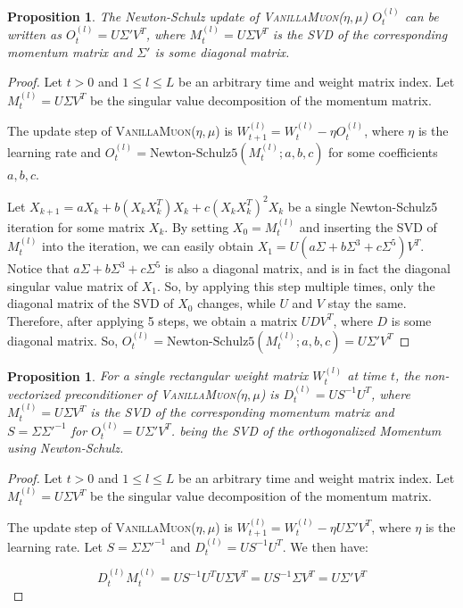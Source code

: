 \documentclass{article}
\theoremstyle{plain}
\newtheorem{proposition}[theorem]{Proposition}
\theoremstyle{definition}
\theoremstyle{remark}
\begin{document}
\begin{proposition}
The Newton-Schulz update of \textsc{VanillaMuon}($\eta, \mu$) $O_{t}^{(l)}$ can be written as $O_{t}^{(l)} = U \Sigma' V^T$, where $M_{t}^{(l)} = U \Sigma V^T$ is the SVD of the corresponding momentum matrix and $\Sigma'$ is some diagonal matrix.
\end{proposition}

\begin{proof}
Let $t > 0$ and $1 \le l \le L$ be an arbitrary time and weight matrix index. Let $M_{t}^{(l)} = U \Sigma V^T$ be the singular value decomposition of the momentum matrix.

The update step of \textsc{VanillaMuon($\eta, \mu$)} is $W_{t+1}^{(l)} = W_t^{(l)} - \eta O_{t}^{(l)}$, where $\eta$ is the learning rate and $O_{t}^{(l)} = \text{Newton-Schulz5}(M_t^{(l)}; a,b,c)$ for some coefficients $a, b, c$. 

Let $X_{k+1} = aX_k + b(X_kX_k^T)X_k + c (X_kX_k^T)^2X_k$ be a single Newton-Schulz5 iteration for some matrix $X_k$. By setting $X_0 = M_{t}^{(l)}$ and inserting the SVD of $M_{t}^{(l)}$ into the iteration, we can easily obtain $X_1 = U(a\Sigma + b\Sigma^3 + c\Sigma^5)V^T$. Notice that $a\Sigma + b\Sigma^3 + c\Sigma^5$ is also a diagonal matrix, and is in fact the diagonal singular value matrix of $X_1$. So, by applying this step multiple times, only the diagonal matrix of the SVD of $X_0$ changes, while $U$ and $V$ stay the same. Therefore, after applying 5 steps, we obtain a matrix $U D V^T$, where $D$ is some diagonal matrix. So, $O_{t}^{(l)} = \text{Newton-Schulz5}(M_{t}^{(l)}; a,b,c) = U \Sigma' V^T$
\end{proof}

\begin{proposition}
For a single rectangular weight matrix $W^{(l)}_t$ at time $t$, the non-vectorized preconditioner of \textsc{VanillaMuon}($\eta, \mu$) is $D_{t}^{(l)} = U S^{-1} U^T$, where $M_{t}^{(l)} = U \Sigma V^T$ is the SVD of the corresponding momentum matrix and $S = \Sigma \Sigma'^{-1}$ for $O_{t}^{(l)} = U \Sigma' V^T$. being the SVD of the orthogonalized Momentum using Newton-Schulz.
\end{proposition}

\begin{proof}
Let $t > 0$ and $1 \le l \le L$ be an arbitrary time and weight matrix index. Let $M_{t}^{(l)} = U \Sigma V^T$ be the singular value decomposition of the momentum matrix.

The update step of \textsc{VanillaMuon}($\eta, \mu$) is $W_{t+1}^{(l)} = W_t^{(l)} - \eta U\Sigma'V^T$, where $\eta$ is the learning rate. Let $S = \Sigma \Sigma'^{-1}$ and $D_{t}^{(l)} = U S^{-1} U^T$. We then have:

\begin{equation}
D_{t}^{(l)}M_{t}^{(l)} = U S^{-1} U^T U \Sigma V^T = U S^{-1}\Sigma V^T = U \Sigma' V^T
\end{equation}
\end{proof}
\end{document}
